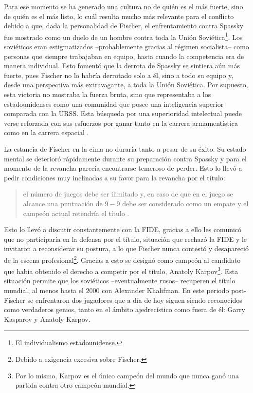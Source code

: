 \documentclass[twoside,openright,12pt,a4paper,spanish]{book}
\begin{document}
Para ese momento se ha generado una cultura no de qui\'en es el m\'as fuerte, sino de qui\'en es el m\'as listo, lo cu\'al resulta mucho m\'as relevante para el conflicto debido a que, dada la personalidad de Fischer, el enfrentamiento contra Spassky fue mostrado como un duelo de un hombre contra toda la Uni\'on Sovi\'etica\footnote{El individualismo estadounidense.}. Los sovi\'eticos eran estigmatizados --probablemente gracias al régimen socialista-- como personas que siempre trabajaban en equipo, hasta cuando la competencia era de manera individual. Esto foment\'o que la derrota de Spassky se sintiera a\'un m\'as fuerte, pues Fischer no lo habr\'ia derrotado solo a \'el, sino a todo su equipo y, desde una perspectiva m\'as extravagante, a toda la Uni\'on Sovi\'etica. Por supuesto, esta victoria no mostraba la fuerza bruta, sino que representaba a los estadounidenses como una comunidad que posee una inteligencia superior comparada con la URSS. Esta búsqueda por una superioridad intelectual puede verse reforzada con sus esfuerzos por ganar tanto en la carrera armament\'istica como en la carrera espacial \cite[p. 15]{millan2012guerra}.

La estancia de Fischer en la cima no duraría tanto a pesar de su éxito. Su estado mental se deterioró rápidamente durante su preparación contra Spassky y para el momento de la revancha parecía encontrarse temeroso de perder. Esto lo llevó a pedir condiciones muy inclinadas a su favor para la revancha por el título: 

\begin{quote} \singlespace
    [...] el número de juegos debe ser ilimitado y, en caso de que en el juego se alcance una puntuación de $9-9$ debe ser considerado como un empate y el campeón actual retendría el título \cite[p. 235]{golombek1976history}.
\end{quote}

Esto lo llevó a discutir constantemente con la FIDE, gracias a ello les comunicó que no participaría en la defensa por el título, situación que rechazó la FIDE y le invitaron a reconsiderar su postura, a lo que Fischer nunca contestó y desapareci\'o de la escena profesional\footnote{Debido a exigencia excesiva sobre Fischer.}. Gracias a esto se designó como campeón al candidato que había obtenido el derecho a competir por el título, Anatoly Karpov\footnote{Por lo mismo, Karpov es el único campeón del mundo que nunca ganó una partida contra otro campeón mundial.}. Esta situación permite que los soviéticos --eventualmente rusos-- recuperen el título mundial, al menos hasta el 2000 con Alexander Khalifman. En este periodo post-Fischer se enfrentaron dos jugadores que a día de hoy siguen siendo reconocidos como verdaderos genios, tanto en el ámbito ajedrecístico como fuera de él: Garry Kasparov y Anatoly Karpov.
\end{document}
